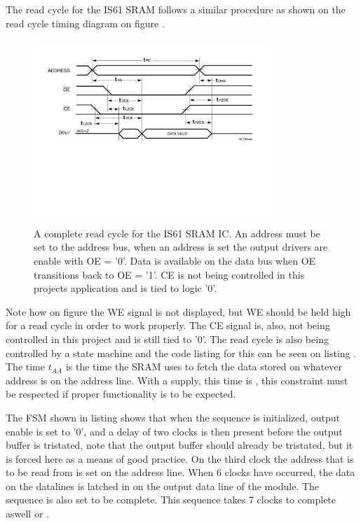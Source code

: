 The read cycle for the IS61 SRAM follows a similar procedure as shown on the read cycle timing diagram on figure .
\begin{figure}[H]
    \centering
    \includegraphics[clip, trim=0 250 0 0, width=0.8\textwidth]{Sections/7_SystemDesign/Figures/7_2_5_IS61_ReadCycle.pdf}
    \caption{A complete read cycle for the IS61 SRAM IC\cite{ISSISRAM}. An address must be set to the address bus, when an address is set the output drivers are enable with OE = '0'. Data is available on the data bus when OE transitions back to OE = '1'. CE is not being controlled in this projects application and is tied to logic '0'.}
    \label{fig:7_2_5_IS61_READ}
\end{figure}

Note how on figure  the WE signal is not displayed, but WE should be held high for a read cycle in order to work properly. The CE signal is, also, not being controlled in this project and is still tied to '0'. The read cycle is also being controlled by a state machine and the code listing for this can be seen on listing . The time $t_{AA}$ is the time the SRAM uses to fetch the data stored on whatever address is on the address line. With a  supply, this time is , this constraint must be respected if proper functionality is to be expected.


 

The FSM shown in listing   shows that when the sequence is initialized, output enable is set to '0', and a delay of two clocks is then present before the output buffer is tristated, note that the output buffer should already be tristated, but it is forced here as a means of good practice. On the third clock the address that is to be read from is set on the address line. When 6 clocks have occurred, the data on the datalines is latched in on the output data line of the module. The sequence is also set to be complete. This sequence takes 7 clocks to complete aswell or . 

